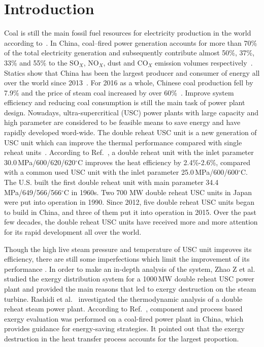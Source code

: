\documentclass[preprint,12pt]{elsarticle}
\begin{document}
\printnomenclature[1.5cm]{}


\section{Introduction}
\label{sec1:intro}
Coal is still the main fossil fuel resources for electricity production in the world according to~\cite{Ouedraogo2013Energy}. 
In China, coal–fired power generation accounts for more than 70\% of the total electricity generation and subsequently contribute almost 50\%, 37\%, 33\% and 55\% to the SO$_X$, NO$_X$, dust and CO$_X$ emission volumes respectively~\cite{Zhang2010Analysis}.
Statics show that China has been the largest producer and consumer of energy all over the world since 2013~\cite{Petroleum2014BP}. 
For 2016 as a whole, Chinese coal production fell by 7.9\% and the price of steam coal increased by over 60\%~\cite{Petroleum2017BP}. 
Improve system efficiency and reducing coal consumption is still the main task of power plant design. Nowadays, ultra-supercritical (USC) power plants with large capacity and high parameter are considered to be feasible means to save energy and have rapidly developed word-wide.
The double reheat USC unit is a new generation of USC unit which can improve the thermal performance compared with single reheat units~\cite{Zhao2017Exergy}. 
According to Ref.~\cite{Zhao2017Exergy}, a double reheat unit with the inlet parameter 30.0\,MPa/600/620/620$^\circ$C improves the heat efficiency by 2.4\%-2.6\%, compared with a common used USC unit with the inlet parameter 25.0\,MPa/600/600$^\circ$C.
 The U.S. built the first double reheat unit with main parameter 34.4 MPa/649/566/566$^\circ$C in 1960s.
 Two 700 MW double reheat USC units in Japan were put into operation in 1990. 
 Since 2012, five  double reheat USC units  began to build in China, and three of them put it into operation in 2015.
 Over the past few decades, the double reheat USC units have received more and more attention for its rapid development all over the world.

  

 Though the high live steam pressure and temperature of USC unit improves its efficiency, there are still some imperfections which limit the improvement of its performance . 
In order to make an in-depth analysis of the system, Zhao Z et al.~\cite{Zhao2017Exergy} studied the exergy distribution system for a 1000\,MW double reheat USC power plant and provided the main reasons that led to exergy destruction on the steam turbine.
 Rashidi et al.~\cite{Rashidi2014Thermodynamic} investigated the thermodynamic analysis of a double reheat steam power plant.
 According to Ref.~\cite{Wu2014Component}, component and process based exergy evaluation was performed on a coal-fired power plant in China, which provides guidance for energy-saving strategies.
 It pointed out that the exergy destruction in the heat transfer process accounts for the largest proportion.
\end{document}
